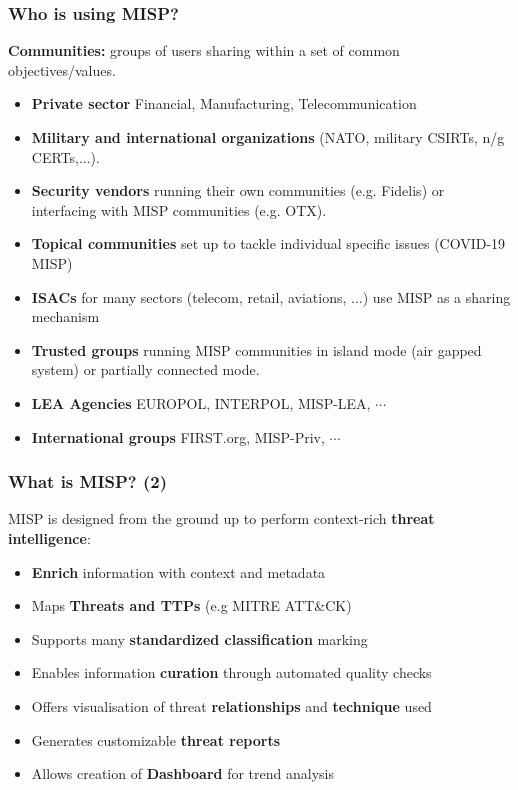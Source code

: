 \begin{frame}
    \frametitle{Who is using MISP?}
    {\bf Communities:} groups of users sharing within a set of common objectives/values.
    \vspace{0.5em}
    \begin{itemize}
        \item {\bf Private sector} Financial, Manufacturing, Telecommunication
        \item {\bf Military and international organizations} (NATO, military CSIRTs, n/g CERTs,...).
        \item {\bf Security vendors} running their own communities (e.g. Fidelis) or interfacing with MISP communities (e.g. OTX).
        \item {\bf Topical communities} set up to tackle individual specific issues (COVID-19 MISP)
        \item {\bf ISACs} for many sectors (telecom, retail, aviations, ...) use MISP as a sharing mechanism
        \item {\bf Trusted groups} running MISP communities in island mode (air gapped system) or partially connected mode.
        \item {\bf LEA Agencies} EUROPOL, INTERPOL, MISP-LEA, $\cdots$
        \item {\bf International groups} FIRST.org, MISP-Priv, $\cdots$
    \end{itemize}
\end{frame}

\begin{frame}
    \frametitle{What is MISP? (2)}
    MISP is designed from the ground up to perform context-rich \textbf{threat intelligence}:
    \vspace{0.5em}
    \begin{itemize}
           \item {\bf Enrich} information with context and metadata
           \item Maps {\bf Threats and TTPs} (e.g MITRE ATT\&CK)
           \item Supports many {\bf standardized classification} marking
           \item Enables information {\bf curation} through automated quality checks
           \item Offers visualisation of threat {\bf relationships} and \textbf{technique} used
           \item Generates customizable {\bf threat reports}
           \item Allows creation of {\bf Dashboard} for trend analysis
    \end{itemize}
\end{frame}

